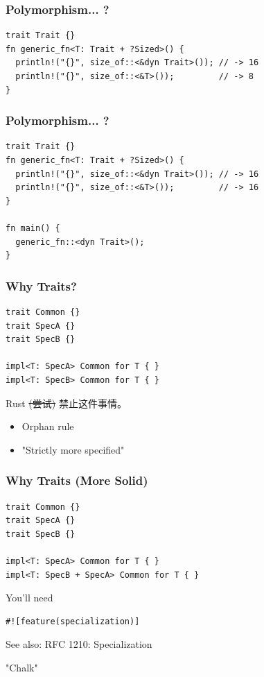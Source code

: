 \documentclass[UTF-8]{ctexbeamer}
\begin{document}
\begin{frame}[fragile]
  \frametitle{Polymorphism... ?}

  \begin{verbatim}
trait Trait {}
fn generic_fn<T: Trait + ?Sized>() {
  println!("{}", size_of::<&dyn Trait>()); // -> 16
  println!("{}", size_of::<&T>());         // -> 8
}
  \end{verbatim}
\end{frame}

\begin{frame}[fragile]
  \frametitle{Polymorphism... ?}

  \begin{verbatim}
trait Trait {}
fn generic_fn<T: Trait + ?Sized>() {
  println!("{}", size_of::<&dyn Trait>()); // -> 16
  println!("{}", size_of::<&T>());         // -> 16
}

fn main() {
  generic_fn::<dyn Trait>();
}
  \end{verbatim}
\end{frame}

\begin{frame}[fragile]
  \frametitle{Why Traits?}
  
  \pause


  \pause

  \begin{verbatim}
trait Common {}
trait SpecA {}
trait SpecB {}

impl<T: SpecA> Common for T { }
impl<T: SpecB> Common for T { }
  \end{verbatim}
  
  \pause
  \vspace{1em}

  Rust \sout{(尝试)} 禁止这件事情。
  \begin{itemize}
    \item Orphan rule
    \pause
    \item "Strictly more specified"
  \end{itemize}
\end{frame}

\begin{frame}[fragile]
  \frametitle{Why Traits (More Solid)}

  \begin{verbatim}
trait Common {}
trait SpecA {}
trait SpecB {}

impl<T: SpecA> Common for T { }
impl<T: SpecB + SpecA> Common for T { }
  \end{verbatim}

  \pause
  \vspace{1em}

  You'll need
  \begin{verbatim}
#![feature(specialization)]
  \end{verbatim}

  See also: RFC 1210: Specialization

  \pause
  \vspace{1em}

  "Chalk"
\end{frame}
\end{document}
